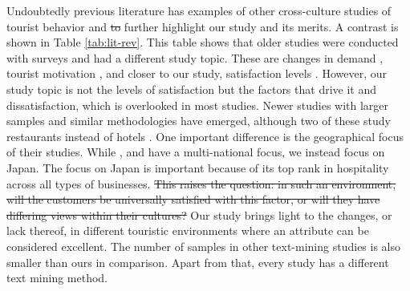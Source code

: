 \documentclass[smallextended,natbib]{svjour3}       %
\providecommand{\DIFadd}[1]{{\protect\color{blue}\uwave{#1}}} %
\providecommand{\DIFdel}[1]{{\protect\color{red}\sout{#1}}}                      %
\providecommand{\DIFaddbegin}{} %
\providecommand{\DIFaddend}{} %
\providecommand{\DIFdelbegin}{} %
\providecommand{\DIFdelend}{} %
\newcommand{\DIFscaledelfig}{0.5}
\newlength{\DIFdelgraphicswidth} %
\newlength{\DIFdelgraphicsheight} %
\newcommand{\DIFaddincludegraphics}[2][]{{\color{blue}\fbox{\DIFOincludegraphics[#1]{#2}}}} %
\newcommand{\DIFdelincludegraphics}[2][]{%
\sbox{\DIFdelgraphicsbox}{\DIFOincludegraphics[#1]{#2}}%
\settoboxwidth{\DIFdelgraphicswidth}{\DIFdelgraphicsbox} %
\settoboxtotalheight{\DIFdelgraphicsheight}{\DIFdelgraphicsbox} %
\scalebox{\DIFscaledelfig}{%
\parbox[b]{\DIFdelgraphicswidth}{\usebox{\DIFdelgraphicsbox}\\[-\baselineskip] \rule{\DIFdelgraphicswidth}{0em}}\llap{\resizebox{\DIFdelgraphicswidth}{\DIFdelgraphicsheight}{%
\setlength{\unitlength}{\DIFdelgraphicswidth}%
\begin{picture}(1,1)%
\thicklines\linethickness{2pt} %
{\color[rgb]{1,0,0}\put(0,0){\framebox(1,1){}}}%
{\color[rgb]{1,0,0}\put(0,0){\line( 1,1){1}}}%
{\color[rgb]{1,0,0}\put(0,1){\line(1,-1){1}}}%
\end{picture}%
}\hspace*{3pt}}} %
} %
\DeclareRobustCommand{\DIFaddbegin}{\DIFOaddbegin \let\includegraphics\DIFaddincludegraphics} %
\DeclareRobustCommand{\DIFaddend}{\DIFOaddend \let\includegraphics\DIFOincludegraphics} %
\DeclareRobustCommand{\DIFdelbegin}{\DIFOdelbegin \let\includegraphics\DIFdelincludegraphics} %
\DeclareRobustCommand{\DIFdelend}{\DIFOaddend \let\includegraphics\DIFOincludegraphics} %
\begin{document}
    Undoubtedly previous literature has examples of other cross-culture studies of tourist behavior and \DIFdelbegin \DIFdel{to }\DIFdelend \DIFaddbegin \DIFadd{may }\DIFaddend further highlight our study and its merits. A contrast is shown in Table \ref{tab:lit-rev}. This table shows that older studies were conducted with surveys and had a different study topic. These are changes in demand \cite[][]{bauer1993changing}, tourist motivation \cite[][]{kim2000}, and closer to our study, satisfaction levels \cite[][]{choi2000}. However, our study topic is not the levels of satisfaction but the factors that drive it and dissatisfaction, which is overlooked in most studies. Newer studies with larger samples and similar methodologies have emerged, although two of these study restaurants instead of hotels \cite[][]{JIA2020104071, HUANG2017117}. One important difference is the geographical focus of their studies. While \cite{FRANCESCO201924} , \cite{JIA2020104071} and \cite{HUANG2017117} have a multi-national focus, we instead focus on Japan. The focus on Japan is important because of its top rank in hospitality across all types of businesses. \DIFdelbegin \DIFdel{This raises the question: in such an environment, will the customers be universally satisfied with this factor, or will they have differing views within their cultures? }\DIFdelend Our study brings light to the changes, or lack thereof, in different touristic environments where an attribute can be considered excellent. The number of samples in other text-mining studies is also smaller than ours in comparison. Apart from that, every study has a different text mining method.
\end{document}
